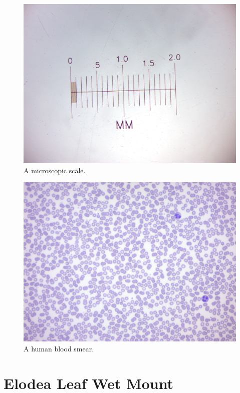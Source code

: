 \begin{figure}

{\centering \includegraphics[width=0.7\linewidth]{./figures/microscope/MM_scale}

}

\caption{A microscopic scale.}\label{fig:scale}
\end{figure}

\begin{figure}

{\centering \includegraphics[width=0.7\linewidth]{./figures/microscope/Blood_smear}

}

\caption{A human blood smear.}\label{fig:smear}
\end{figure}

\section{Elodea Leaf Wet Mount}\label{elodea-leaf-wet-mount}

